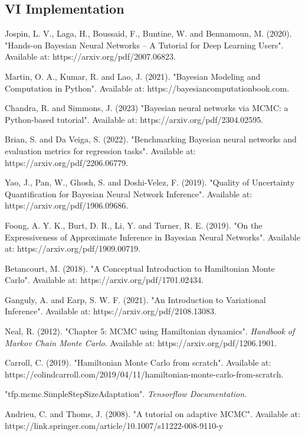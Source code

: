 \documentclass[conference]{IEEEtran}
\begin{document}
\subsection{VI Implementation}


\begin{thebibliography}{00}

 Jospin, L. V., Laga, H., Boussaid, F., Buntine, W. and Bennamoun, M. (2020). "Hands-on Bayesian Neural Networks – A Tutorial for Deep Learning Users". Available at: https://arxiv.org/pdf/2007.06823.

 Martin, O. A., Kumar, R. and Lao, J. (2021). "Bayesian Modeling and Computation in Python". Available at: https://bayesiancomputationbook.com.

 Chandra, R. and Simmons, J. (2023) "Bayesian neural networks via MCMC: a Python-based tutorial". Available at: https://arxiv.org/pdf/2304.02595.

 Brian, S. and Da Veiga, S. (2022). "Benchmarking Bayesian neural networks and evaluation metrics for regression tasks". Available at: https://arxiv.org/pdf/2206.06779.

 Yao, J., Pan, W., Ghosh, S. and Doshi-Velez, F. (2019). "Quality of Uncertainty Quantification for Bayesian Neural Network Inference". Available at: https://arxiv.org/pdf/1906.09686.

 Foong, A. Y. K., Burt, D. R., Li, Y. and Turner, R. E. (2019). "On the Expressiveness of Approximate Inference in Bayesian Neural Networks". Available at: https://arxiv.org/pdf/1909.00719.

 Betancourt, M. (2018). "A Conceptual Introduction to Hamiltonian Monte Carlo". Available at: https://arxiv.org/pdf/1701.02434.

 Ganguly, A. and Earp, S. W. F. (2021). "An Introduction to Variational Inference". Available at: https://arxiv.org/pdf/2108.13083.

 Neal, R. (2012). "Chapter 5: MCMC using Hamiltonian dynamics". \textit{Handbook of Markov Chain Monte Carlo}. Available at: https://arxiv.org/pdf/1206.1901.

 Carroll, C. (2019). "Hamiltonian Monte Carlo from scratch". Available at: https://colindcarroll.com/2019/04/11/hamiltonian-monte-carlo-from-scratch.

 "tfp.mcmc.SimpleStepSizeAdaptation". \textit{Tensorflow Documentation}.

 Andrieu, C. and Thoms, J. (2008). "A tutorial on adaptive MCMC". Available at: https://link.springer.com/article/10.1007/s11222-008-9110-y

\end{thebibliography}
\vspace{12pt}
\end{document}

